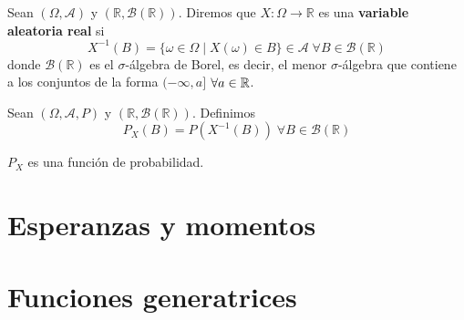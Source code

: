 \documentclass[PREyA.tex]{subfiles}
\begin{document}
\begin{defi}Sean $(\Omega,\mathscr{A})$ y $(\mathbb{R},\mathcal{B}(\mathbb{R}))$. Diremos que $X: \Omega \rightarrow \mathbb{R}$ es una \textbf{variable aleatoria real} si 
\begin{equation*}
X^{-1}(B)=\{\omega\in\Omega\;|\;X(\omega)\in B\}\in\mathscr{A}\;\forall B\in \mathcal{B}(\mathbb{R})
\end{equation*}
donde $\mathcal{B}(\mathbb{R})$ es el $\sigma$-álgebra de Borel, es decir, el menor $\sigma$-álgebra que contiene a los conjuntos de la forma $(-\infty,a]$ $\forall a \in \mathbb{R}$.
\end{defi}

\begin{defi}
Sean $(\Omega,\mathscr{A},P)$ y $(\mathbb{R},\mathcal{B}(\mathbb{R}))$. Definimos
\begin{equation*}
P_X(B)=P(X^{-1}(B)) \; \forall B \in \mathcal{B}(\mathbb{R})
\end{equation*}
\end{defi}
\begin{prop}$P_X$ es una funci\'on de probabilidad.
\end{prop}

\section{Esperanzas y momentos}
\section{Funciones generatrices}
\end{document}
